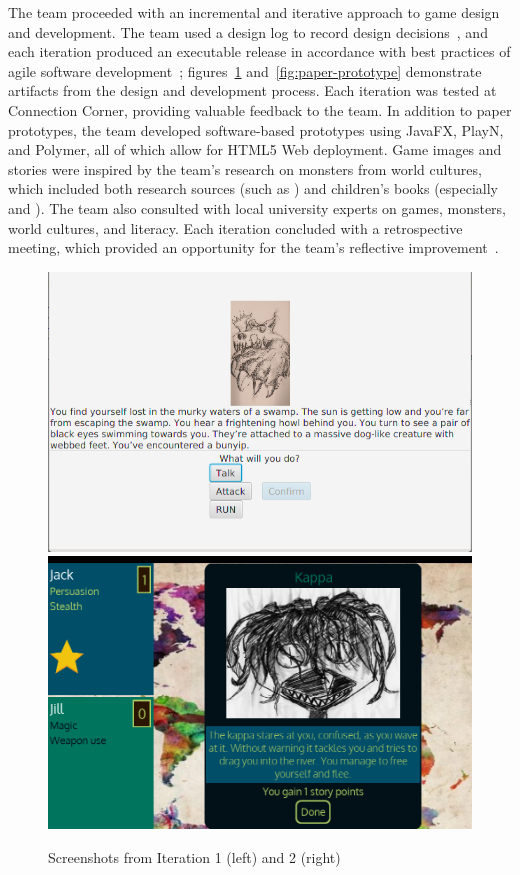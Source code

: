 \documentclass[a4paper]{article}
\begin{document}
The team proceeded with an incremental and
iterative approach to game design and development.
The team used a design log to record design decisions~\citep{Cook2011},
and each iteration
produced an executable release in accordance with best practices of
agile software development~\citep{Cockburn2006};
figures~\ref{fig:screenshots} and~\ref{fig:paper-prototype} demonstrate
artifacts from the design and development process.
Each iteration was tested at
Connection Corner, providing valuable feedback to the
team. 
In addition to paper prototypes, the team 
developed software-based prototypes using JavaFX, PlayN, and Polymer, 
all of which allow for HTML5 Web deployment.
Game images and stories were inspired by the team's research on monsters
from world cultures, which included both research sources
(such as \citet{Cohen1996}) and children's books (especially
\citet{Steer2008} and \citet{Stowell2013}).
The team also consulted with local university experts on
games, monsters, world cultures, and literacy.
Each iteration concluded with a retrospective
meeting, which provided an opportunity for the
team's reflective improvement~\citep{Kerth2001,Schon1984}.

\begin{figure}
\centering
\includegraphics[width=\figwidth]{iteration-1}
\includegraphics[width=\figwidth]{kappa-encounter}
\caption{Screenshots from Iteration 1 (left) and 2 (right)}
\label{fig:screenshots}
\end{figure}
\end{document}

